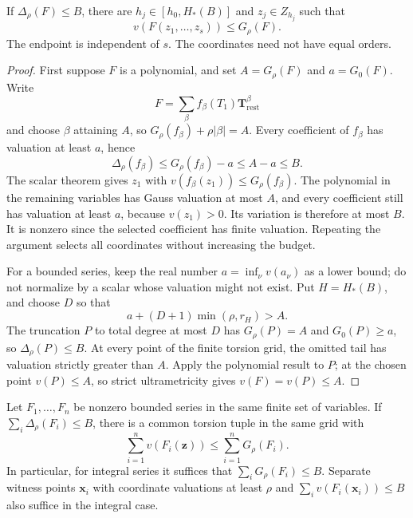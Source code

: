 \begin{theorem}
\label{thm:series}
If \(\Delta_\rho(F)\le B\), there are \(h_j\in[h_0,H_*(B)]\) and \(z_j\in Z_{h_j}\) such that
\[
 v(F(z_1,\ldots,z_s))\le G_\rho(F).
\]
The endpoint is independent of \(s\). The coordinates need not have equal orders.
\end{theorem}

\begin{proof}
First suppose \(F\) is a polynomial, and set \(A=G_\rho(F)\) and \(a=G_0(F)\). Write
\[
 F=\sum_\beta f_\beta(T_1)\mathbf T_{\mathrm{rest}}^\beta
\]
and choose \(\beta\) attaining \(A\), so
\(G_\rho(f_\beta)+\rho|\beta|=A\).
Every coefficient of \(f_\beta\) has valuation at least \(a\), hence
\[
 \Delta_\rho(f_\beta)\le G_\rho(f_\beta)-a\le A-a\le B.
\]
The scalar theorem gives \(z_1\) with
\(v(f_\beta(z_1))\le G_\rho(f_\beta)\).
The polynomial in the remaining variables has Gauss valuation at most \(A\), and every coefficient still has valuation at least \(a\), because \(v(z_1)>0\). Its variation is therefore at most \(B\). It is nonzero since the selected coefficient has finite valuation. Repeating the argument selects all coordinates without increasing the budget.

For a bounded series, keep the real number \(a=\inf_\nu v(a_\nu)\) as a lower bound; do not normalize by a scalar whose valuation might not exist. Put \(H=H_*(B)\), and choose \(D\) so that
\[
 a+(D+1)\min(\rho,r_H)>A.
\]
The truncation \(P\) to total degree at most \(D\) has
\(G_\rho(P)=A\) and \(G_0(P)\ge a\), so
\(\Delta_\rho(P)\le B\).
At every point of the finite torsion grid, the omitted tail has valuation strictly greater than \(A\). Apply the polynomial result to \(P\); at the chosen point \(v(P)\le A\), so strict ultrametricity gives \(v(F)=v(P)\le A\).
\end{proof}

\begin{corollary}
\label{cor:packets}
Let \(F_1,\ldots,F_n\) be nonzero bounded series in the same finite set of variables. If
\(\sum_i\Delta_\rho(F_i)\le B\), there is a common torsion tuple in the same grid with
\[
 \sum_{i=1}^n v(F_i(\mathbf z))
 \le \sum_{i=1}^nG_\rho(F_i).
\]
In particular, for integral series it suffices that
\(\sum_iG_\rho(F_i)\le B\).
Separate witness points \(\mathbf x_i\) with coordinate valuations at least \(\rho\) and
\(\sum_i v(F_i(\mathbf x_i))\le B\)
also suffice in the integral case.
\end{corollary}

